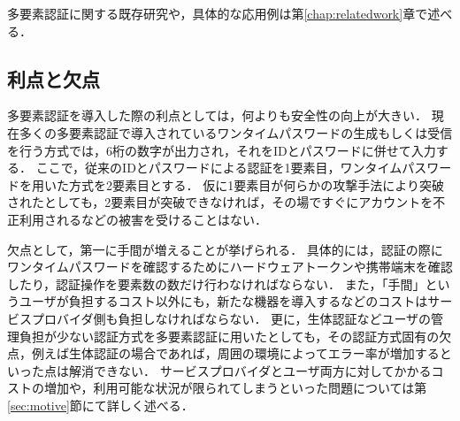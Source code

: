 多要素認証に関する既存研究や，具体的な応用例は第\ref{chap:relatedwork}章で述べる．

\subsection{利点と欠点}
多要素認証を導入した際の利点としては，何よりも安全性の向上が大きい．
現在多くの多要素認証で導入されているワンタイムパスワードの生成もしくは受信を行う方式では，6桁の数字が出力され，それをIDとパスワードに併せて入力する．
ここで，従来のIDとパスワードによる認証を1要素目，ワンタイムパスワードを用いた方式を2要素目とする．
仮に1要素目が何らかの攻撃手法により突破されたとしても，2要素目が突破できなければ，その場ですぐにアカウントを不正利用されるなどの被害を受けることはない．



欠点として，第一に手間が増えることが挙げられる．
具体的には，認証の際にワンタイムパスワードを確認するためにハードウェアトークンや携帯端末を確認したり，認証操作を要素数の数だけ行わなければならない．
また，「手間」というユーザが負担するコスト以外にも，新たな機器を導入するなどのコストはサービスプロバイダ側も負担しなければならない．
更に，生体認証などユーザの管理負担が少ない認証方式を多要素認証に用いたとしても，その認証方式固有の欠点，例えば生体認証の場合であれば，周囲の環境によってエラー率が増加するといった点は解消できない．
サービスプロバイダとユーザ両方に対してかかるコストの増加や，利用可能な状況が限られてしまうといった問題については第\ref{sec:motive}節にて詳しく述べる．

